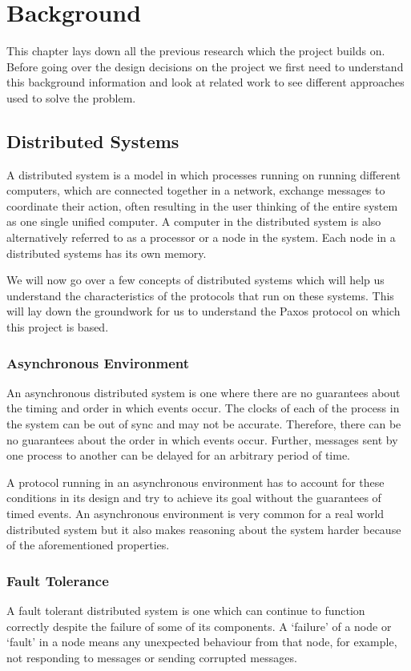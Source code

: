 \chapter{Background}
This chapter lays down all the previous research which the project builds on. Before
going over the design decisions on the project we first need to understand this
background information and look at related work to see different approaches used
to solve the problem.

\section{Distributed Systems}
A distributed system is a model in which processes running on running different
computers, which are connected together in a network, exchange messages to coordinate
their action, often resulting in the user thinking of the entire system as one single
unified computer. A computer in the distributed system is also alternatively referred to as a
processor or a node in the system. Each node in a distributed systems has its
own memory.

We will now go over a few concepts of distributed systems which will help us understand
the characteristics of the protocols that run on these systems. This will lay down the
groundwork for us to understand the Paxos protocol on which this project is based.

\subsection{Asynchronous Environment}
An asynchronous distributed system is one where there are no guarantees about the
timing and order in which events occur.
The clocks of each of the process in the system can be out of sync and may not be
accurate. Therefore, there can be no guarantees about the order in which events occur.
Further, messages sent by one process to another can be delayed for an arbitrary period of time.

A protocol running in an asynchronous environment has to account for these conditions
in its design and try to achieve its goal without the guarantees of timed events.
An asynchronous environment is very common for a real world distributed system but
it also makes reasoning about the system harder because of the aforementioned properties.

\subsection{Fault Tolerance}
A fault tolerant distributed system is one which can continue to function correctly
despite the failure of some of its components. A `failure' of a node or `fault' in a node
means any unexpected behaviour from that node, for example, not responding to messages
or sending corrupted messages.

